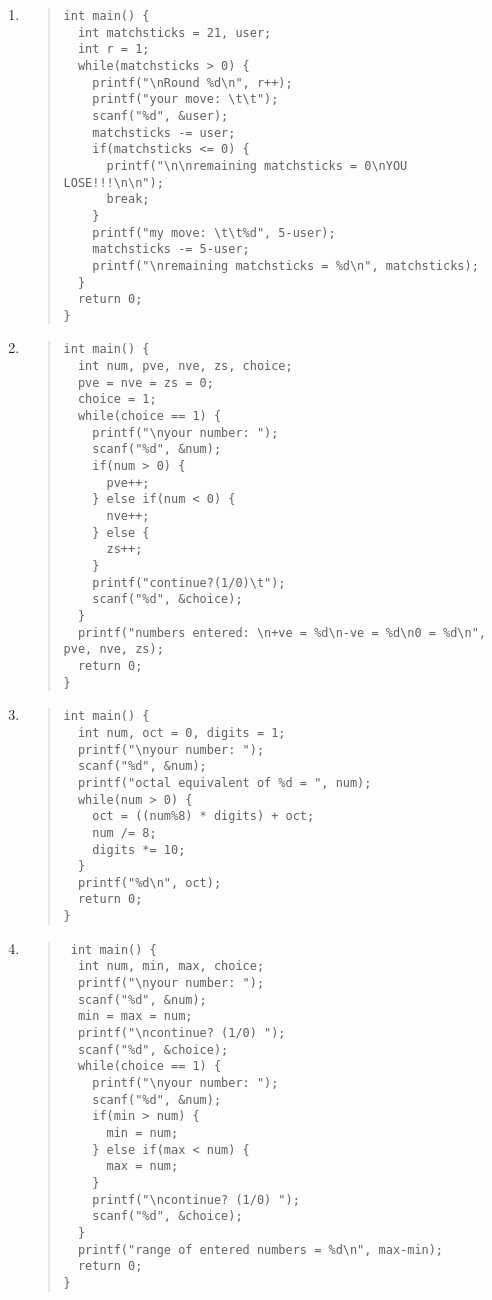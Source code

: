 \documentclass{report}
\begin{document}
\begin{enumerate}
  \item \begin{quote} \begin{verbatim}
int main() {
  int matchsticks = 21, user;
  int r = 1;
  while(matchsticks > 0) {
    printf("\nRound %d\n", r++);
    printf("your move: \t\t");
    scanf("%d", &user);
    matchsticks -= user;
    if(matchsticks <= 0) {
      printf("\n\nremaining matchsticks = 0\nYOU LOSE!!!\n\n");
      break;
    }
    printf("my move: \t\t%d", 5-user);
    matchsticks -= 5-user;
    printf("\nremaining matchsticks = %d\n", matchsticks);
  }
  return 0;
}
  \end{verbatim} \end{quote}

  \item \begin{quote} \begin{verbatim}
int main() {
  int num, pve, nve, zs, choice;
  pve = nve = zs = 0;
  choice = 1;
  while(choice == 1) {
    printf("\nyour number: ");
    scanf("%d", &num);
    if(num > 0) {
      pve++;
    } else if(num < 0) {
      nve++;
    } else {
      zs++;
    }
    printf("continue?(1/0)\t");
    scanf("%d", &choice);
  }
  printf("numbers entered: \n+ve = %d\n-ve = %d\n0 = %d\n", pve, nve, zs);
  return 0;
}
  \end{verbatim} \end{quote}

  \item \begin{quote} \begin{verbatim}
int main() {
  int num, oct = 0, digits = 1;
  printf("\nyour number: ");
  scanf("%d", &num);
  printf("octal equivalent of %d = ", num);
  while(num > 0) {
    oct = ((num%8) * digits) + oct;
    num /= 8;
    digits *= 10;
  }
  printf("%d\n", oct);
  return 0;
}
  \end{verbatim} \end{quote}

  \item \begin{quote} \begin{verbatim}
 int main() {
  int num, min, max, choice;
  printf("\nyour number: ");
  scanf("%d", &num);
  min = max = num;
  printf("\ncontinue? (1/0) ");
  scanf("%d", &choice);
  while(choice == 1) {
    printf("\nyour number: ");
    scanf("%d", &num);
    if(min > num) {
      min = num;
    } else if(max < num) {
      max = num;
    }
    printf("\ncontinue? (1/0) ");
    scanf("%d", &choice);
  }
  printf("range of entered numbers = %d\n", max-min);
  return 0;
} \end{verbatim} \end{quote}
\end{enumerate}
\end{document}
